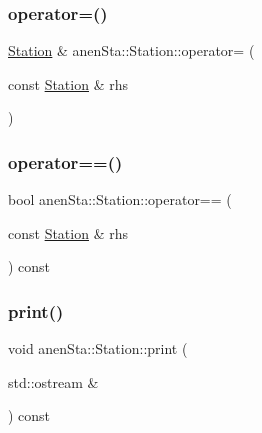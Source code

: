 \mbox{\label{classanen_sta_1_1_station_aefbe0460eb39098b3e1ed4b085ecefab}} 
\subsubsection{\texorpdfstring{operator=()}{operator=()}}
{\footnotesize\ttfamily \mbox{\hyperlink{classanen_sta_1_1_station}{Station}} \& anen\+Sta\+::\+Station\+::operator= (\begin{DoxyParamCaption}\item[{const \mbox{\hyperlink{classanen_sta_1_1_station}{Station}} \&}]{rhs }\end{DoxyParamCaption})}

\mbox{\label{classanen_sta_1_1_station_a402c117d0cff0994d195c2b7027f57c6}} 
\subsubsection{\texorpdfstring{operator==()}{operator==()}}
{\footnotesize\ttfamily bool anen\+Sta\+::\+Station\+::operator== (\begin{DoxyParamCaption}\item[{const \mbox{\hyperlink{classanen_sta_1_1_station}{Station}} \&}]{rhs }\end{DoxyParamCaption}) const}

\mbox{\label{classanen_sta_1_1_station_a463e83848b188691dc554003b995ae6d}} 
\subsubsection{\texorpdfstring{print()}{print()}}
{\footnotesize\ttfamily void anen\+Sta\+::\+Station\+::print (\begin{DoxyParamCaption}\item[{std\+::ostream \&}]{ }\end{DoxyParamCaption}) const}

